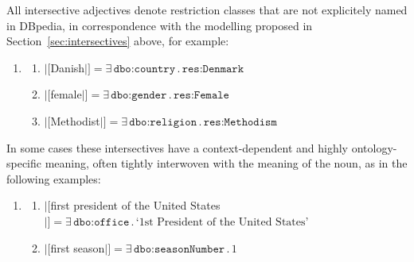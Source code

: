 \documentclass[11pt]{article}
\begin{document}
All intersective adjectives denote restriction classes that are not explicitely named in DBpedia, 
in correspondence with the modelling proposed in Section~\ref{sec:intersectives} above, for example:
\begin{enumerate}
\item \begin{enumerate}
 \item $|[$Danish$|]=\exists\,\texttt{dbo:country}\,.\,\texttt{res:Denmark}$
 \item $|[$female$|]=\exists\,\texttt{dbo:gender}\,.\,\texttt{res:Female}$
 \item $|[$Methodist$|]=\exists\,\texttt{dbo:religion}\,.\,\texttt{res:Methodism}$
 \end{enumerate}
\end{enumerate}

In some cases these intersectives have a context-dependent and highly ontology-specific meaning, 
often tightly interwoven with the meaning of the noun, as in the following examples:
\begin{enumerate}
\item \begin{enumerate}
\item $|[$first president of the United States$|]=\exists\,\texttt{dbo:office}\,.\,\text{`1st President of the United States'}$
\item $|[$first season$|]=\exists\,\texttt{dbo:seasonNumber}\,.\,1$
\end{enumerate}
\end{enumerate}
\end{document}
